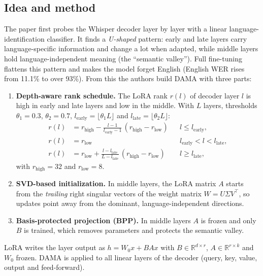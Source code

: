 \documentclass[11pt,a4paper]{article}
\begin{document}
\subsection{Idea and method}
The paper first probes the Whisper decoder layer by layer with a linear language-identification classifier. It finds a \emph{U-shaped} pattern: early and late layers carry language-specific information and change a lot when adapted, while middle layers hold language-independent meaning (the ``semantic valley''). Full fine-tuning flattens this pattern and makes the model forget English (English WER rises from 11.1\% to over 93\%). From this the authors build DAMA with three parts:
\begin{enumerate}
\item \textbf{Depth-aware rank schedule.} The LoRA rank $r(l)$ of decoder layer $l$ is high in early and late layers and low in the middle. With $L$ layers, thresholds $\theta_1=0.3$, $\theta_2=0.7$, $l_{\text{early}}=\lfloor\theta_1 L\rfloor$ and $l_{\text{late}}=\lfloor\theta_2 L\rfloor$:
\begin{align*}
r(l) &= r_{\text{high}} - \tfrac{l-1}{l_{\text{early}}-1}\,(r_{\text{high}}-r_{\text{low}}) && l\le l_{\text{early}},\\
r(l) &= r_{\text{low}} && l_{\text{early}}<l<l_{\text{late}},\\
r(l) &= r_{\text{low}} + \tfrac{l-l_{\text{late}}}{L-l_{\text{late}}}\,(r_{\text{high}}-r_{\text{low}}) && l\ge l_{\text{late}},
\end{align*}
with $r_{\text{high}}=32$ and $r_{\text{low}}=8$.
\item \textbf{SVD-based initialization.} In middle layers, the LoRA matrix $A$ starts from the \emph{trailing} right singular vectors of the weight matrix $W=U\Sigma V^\top$, so updates point away from the dominant, language-independent directions.
\item \textbf{Basis-protected projection (BPP).} In middle layers $A$ is frozen and only $B$ is trained, which removes parameters and protects the semantic valley.
\end{enumerate}
LoRA writes the layer output as $h=W_0x+BAx$ with $B\in\mathbb{R}^{d\times r}$, $A\in\mathbb{R}^{r\times k}$ and $W_0$ frozen. DAMA is applied to all linear layers of the decoder (query, key, value, output and feed-forward).
\end{document}
